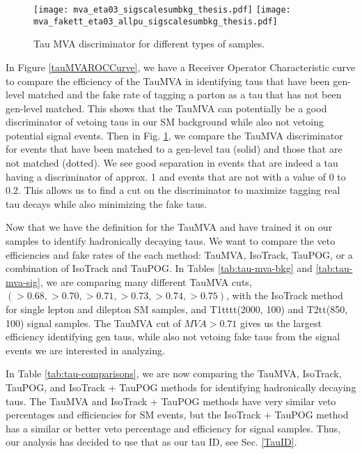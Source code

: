 \begin{figure}[!htb]
	\begin{center}
		\texttt{[image: mva\_eta03\_sigscalesumbkg\_thesis.pdf]}
		\texttt{[image: mva\_fakett\_eta03\_allpu\_sigscalesumbkg\_thesis.pdf]} \\
	\end{center}
	\caption[Tau MVA Discriminator]{Tau MVA discriminator for different types of samples.
	}
	\label{fig:tau-discriminator}
\end{figure}



In Figure \ref{tauMVAROCCurve}, we have a Receiver Operator Characteristic curve to compare the efficiency of the TauMVA in identifying taus that have been gen-level matched and the fake rate of tagging a parton as a tau that has not been gen-level matched. This shows that the TauMVA can potentially be a good discriminator of vetoing taus in our SM background while also not vetoing potential signal events. Then in Fig. \ref{fig:tau-discriminator}, we compare the TauMVA discriminator for events that have been matched to a gen-level tau (solid) and those that are not matched (dotted). We see good separation in events that are indeed a tau having a discriminator of approx. 1 and events that are not with a value of 0 to 0.2. This allows us to find a cut on the discriminator to maximize tagging real tau decays while also minimizing the fake taus.

Now that we have the definition for the TauMVA and have trained it on our samples to identify hadronically decaying taus. We want to compare the veto efficiencies and fake rates of the each method: TauMVA, IsoTrack, TauPOG, or a combination of IsoTrack and TauPOG. 
In Tables \ref{tab:tau-mva-bkg} and \ref{tab:tau-mva-sig}, we are comparing many different TauMVA cuts, $(>0.68, >0.70, >0.71, >0.73, >0.74, >0.75)$, with the IsoTrack method for \ttbar{} single lepton and dilepton SM samples, and T1tttt(2000, 100) and T2tt(850, 100) signal samples. The TauMVA cut of $MVA>0.71$ gives us the largest efficiency identifying gen taus, while also not vetoing fake taus from the signal events we are interested in analyzing.

In Table \ref{tab:tau-comparisons}, we are now comparing the TauMVA, IsoTrack, TauPOG, and IsoTrack + TauPOG methods for identifying hadronically decaying taus. The TauMVA and IsoTrack + TauPOG methods have very similar veto percentages and efficiencies for SM events, but the IsoTrack + TauPOG method has a similar or better veto percentage and efficiency for signal samples. Thus, our analysis has decided to use that as our tau ID, see Sec. \ref{TauID}.